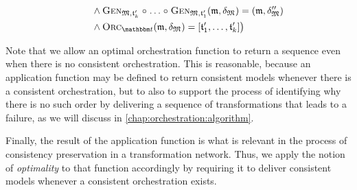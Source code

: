 \begin{definition}
\begin{align*}
            & \formulaskip \formulaskip
            \land \generalizationfunction{\metamodeltuple{M},\transformation{t}_{k}'} \concatfunction \dots \concatfunction \generalizationfunction{\metamodeltuple{M},\transformation{t}_{1}'}(\modeltuple{m}, \changetuple{\metamodeltuple{M}}) = (\modeltuple{m}, \changetuple{\metamodeltuple{M}}'') \\
            & \formulaskip \formulaskip
            \land \orcfunction{\transformationset{T}}(\modeltuple{m}, \changetuple{\metamodeltuple{M}}) = \sequenced{\transformation{t}_{1}', \dots, \transformation{t}_{k}'} %
        \bigr) %
    \end{align*}
\end{definition}

Note that we allow an optimal orchestration function to return a sequence even when there is no consistent orchestration.
This is reasonable, because an application function may be defined to return consistent models whenever there is a consistent orchestration, but to also to support the process of identifying why there is no such order by delivering a sequence of transformations that leads to a failure, as we will discuss in \autoref{chap:orchestration:algorithm}.

Finally, the result of the application function is what is relevant in the process of consistency preservation in a transformation network.
Thus, we apply the notion of \emph{optimality} to that function accordingly by requiring it to deliver consistent models whenever a consistent orchestration exists.

